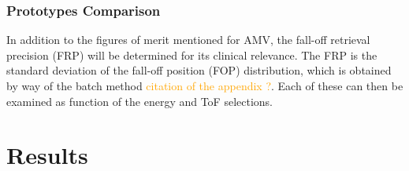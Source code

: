 \documentclass[a4paper,english,12pt]{article}
\newcommand{\ds}[2][orange]{\textcolor{#1}{#2}}
\begin{document}





\subsubsection{Prototypes Comparison}

In addition to the figures of merit mentioned for AMV, the fall-off retrieval precision (FRP) will be determined for its clinical relevance. The FRP is the standard deviation of the fall-off position (FOP) distribution, which is obtained by way of the batch method \ds{citation of the appendix ?}. Each of these can then be examined as function of the energy and ToF selections.


\section{Results}
\end{document}
